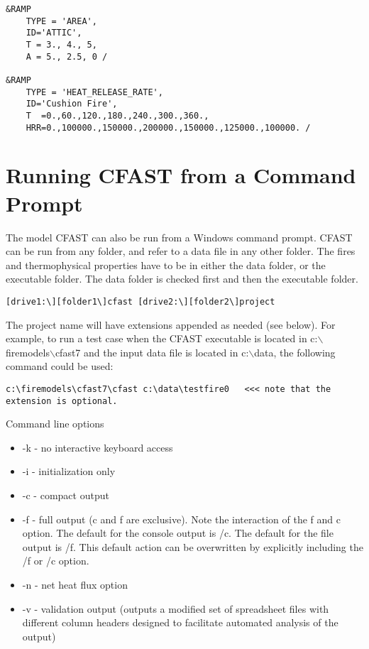 \clearpage
\begin{lstlisting}
&RAMP
	TYPE = 'AREA',
	ID='ATTIC',
	T = 3., 4., 5,
	A = 5., 2.5, 0 /

&RAMP
	TYPE = 'HEAT_RELEASE_RATE',
	ID='Cushion Fire',
	T  =0.,60.,120.,180.,240.,300.,360.,
	HRR=0.,100000.,150000.,200000.,150000.,125000.,100000. /
\end{lstlisting}




\chapter{Running CFAST from a Command Prompt}

The model CFAST can also be run from a Windows command prompt.  CFAST can be run from any folder, and refer to a data file in any other folder. The fires and thermophysical properties have to be in either the data folder, or the executable folder. The data folder is checked first and then the executable folder.

\begin{lstlisting}
[drive1:\][folder1\]cfast [drive2:\][folder2\]project
\end{lstlisting}

The project name will have extensions appended as needed (see below). For example, to run a test case when the CFAST executable is located in c:$\backslash$firemodels$\backslash$cfast7 and the input data file is located in c:$\backslash$data, the following command could be used:

\begin{lstlisting}
c:\firemodels\cfast7\cfast c:\data\testfire0   <<< note that the extension is optional.
\end{lstlisting}

Command line options

\begin{itemize}
\item -k - no interactive keyboard access
\item -i - initialization only
\item -c - compact output
\item -f - full output (c and f are exclusive). Note the interaction of the f and c option. The default for the console output is /c. The default for the file output is /f. This default action can be overwritten by explicitly including the /f or /c option.
\item -n - net heat flux option
\item -v - validation output (outputs a modified set of spreadsheet files with different column headers designed to facilitate automated analysis of the output)
\end{itemize}


\label{last_page}


